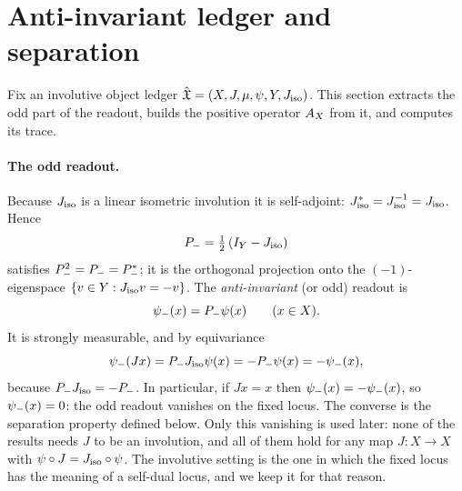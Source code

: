 \section{Anti-invariant ledger and separation}
\label{sec:anti_invariant_ledger}

Fix an involutive object ledger \(\hat{\mathfrak{X}}=(X,J,\mu,\psi,Y,J_{\mathrm{iso}})\).  This
section extracts the odd part of the readout, builds the positive
operator \(A_{X}\) from it, and computes its trace.

\paragraph{The odd readout.}
Because \(J_{\mathrm{iso}}\) is a linear isometric involution it is self-adjoint:
\(J_{\mathrm{iso}}^*=J_{\mathrm{iso}}^{-1}=J_{\mathrm{iso}}\).  Hence
\[
  P_{-}=\tfrac12\,(I_Y-J_{\mathrm{iso}})
\]
satisfies \(P_{-}^2=P_{-}=P_{-}^*\); it is the orthogonal
projection onto the \((-1)\)-eigenspace \(\{v\in Y:J_{\mathrm{iso}} v=-v\}\).
The \emph{anti-invariant} (or odd) readout is
\[
  \psi_{-}(x)=P_{-}\psi(x)\qquad(x\in X).
\]
It is strongly measurable, and by equivariance
\[
  \psi_{-}(Jx)=P_{-}J_{\mathrm{iso}}\psi(x)=-P_{-}\psi(x)=-\psi_{-}(x),
\]
because \(P_{-}J_{\mathrm{iso}}=-P_{-}\).  In particular, if \(Jx=x\) then
\(\psi_{-}(x)=-\psi_{-}(x)\), so \(\psi_{-}(x)=0\): the odd readout vanishes on
the fixed locus.  The converse is the separation property defined
below.  Only this vanishing is used later: none of the results needs
\(J\) to be an involution, and all of them hold for any map
\(J:X\to X\) with \(\psi\circ J=J_{\mathrm{iso}}\circ\psi\).  The involutive
setting is the one in which the fixed locus has the meaning of a
self-dual locus, and we keep it for that reason.

